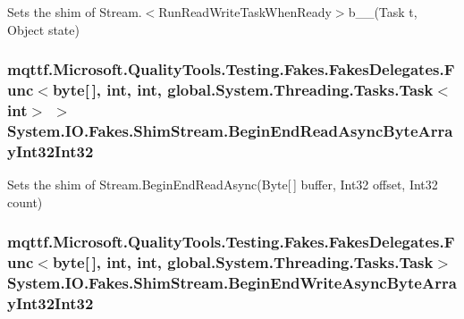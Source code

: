 Sets the shim of Stream.$<$Run\-Read\-Write\-Task\-When\-Ready$>$b\-\_\-\-\_(\-Task t, Object state)

\hypertarget{class_system_1_1_i_o_1_1_fakes_1_1_shim_stream_a164c87b4d52013f982b42630a8af5a48}{
\subsubsection[{Begin\-End\-Read\-Async\-Byte\-Array\-Int32\-Int32}]{\setlength{\rightskip}{0pt plus 5cm}mqttf.\-Microsoft.\-Quality\-Tools.\-Testing.\-Fakes.\-Fakes\-Delegates.\-Func$<$byte\mbox{[}$\,$\mbox{]}, int, int, global.\-System.\-Threading.\-Tasks.\-Task$<$int$>$ $>$ System.\-I\-O.\-Fakes.\-Shim\-Stream.\-Begin\-End\-Read\-Async\-Byte\-Array\-Int32\-Int32\hspace{0.3cm}{\ttfamily [set]}}}\label{class_system_1_1_i_o_1_1_fakes_1_1_shim_stream_a164c87b4d52013f982b42630a8af5a48}


Sets the shim of Stream.\-Begin\-End\-Read\-Async(\-Byte\mbox{[}$\,$\mbox{]} buffer, Int32 offset, Int32 count)

\hypertarget{class_system_1_1_i_o_1_1_fakes_1_1_shim_stream_a1a1ea640d06934cb53d62167bf2cb2c2}{
\subsubsection[{Begin\-End\-Write\-Async\-Byte\-Array\-Int32\-Int32}]{\setlength{\rightskip}{0pt plus 5cm}mqttf.\-Microsoft.\-Quality\-Tools.\-Testing.\-Fakes.\-Fakes\-Delegates.\-Func$<$byte\mbox{[}$\,$\mbox{]}, int, int, global.\-System.\-Threading.\-Tasks.\-Task$>$ System.\-I\-O.\-Fakes.\-Shim\-Stream.\-Begin\-End\-Write\-Async\-Byte\-Array\-Int32\-Int32\hspace{0.3cm}{\ttfamily [set]}}}\label{class_system_1_1_i_o_1_1_fakes_1_1_shim_stream_a1a1ea640d06934cb53d62167bf2cb2c2}


